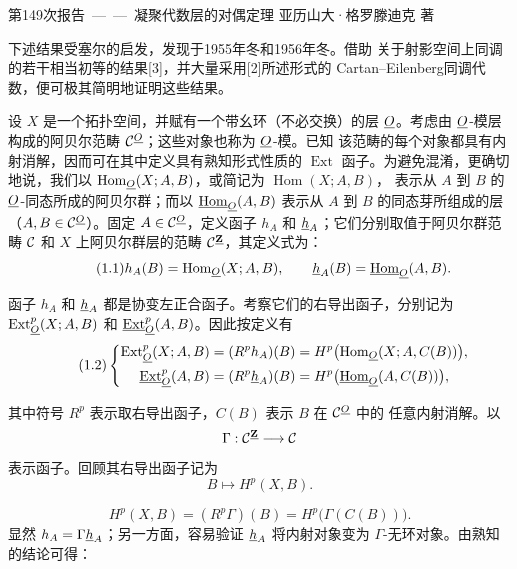 \unit{第149次报告——凝聚代数层的对偶定理}
%
  {亚历山大·格罗滕迪克 著}

下述结果受塞尔的启发，发现于1955年冬和1956年冬。借助
关于射影空间上同调的若干相当初等的结果[3]，并大量采用[2]所述形式的
Cartan--Eilenberg同调代数，便可极其简明地证明这些结果。


设 $X$ 是一个拓扑空间，并赋有一个带幺环（不必交换）的层 $\underline{O}$。考虑由
$\underline{O}$-模层构成的阿贝尔范畴 $\mathcal C^{\underline{O}}$；这些对象也称为 $\underline{O}$-模。已知
该范畴的每个对象都具有内射消解，因而可在其中定义具有熟知形式性质的
$\operatorname{Ext}$ 函子。为避免混淆，更确切地说，我们以
$\operatorname{Hom}_{\underline{O}}(X;A,B)$，或简记为 $\operatorname{Hom}(X;A,B)$，
表示从 $A$ 到 $B$ 的 $\underline{O}$-同态所成的阿贝尔群；而以
$\underline{\operatorname{Hom}}_{\underline{O}}(A,B)$ 表示从 $A$ 到 $B$ 的同态芽所组成的层
（$A,B\in\mathcal C^{\underline{O}}$）。固定 $A\in\mathcal C^{\underline{O}}$，定义函子 $h_A$ 和
$\underline{h}_A$；它们分别取值于阿贝尔群范畴 $\mathcal C$ 和 $X$ 上阿贝尔群层的范畴
$\mathcal C^{\underline{\mathbf Z}}$，其定义式为：
\begin{equation}\tag{1.1}
  h_A(B)=\operatorname{Hom}_{\underline{O}}(X;A,B),
  \qquad
  \underline{h}_A(B)=\underline{\operatorname{Hom}}_{\underline{O}}(A,B).
\end{equation}

函子 $h_A$ 和 $\underline{h}_A$ 都是协变左正合函子。考察它们的右导出函子，分别记为
$\operatorname{Ext}_{\underline{O}}^{p}(X;A,B)$ 和 $\underline{\operatorname{Ext}}_{\underline{O}}^{p}(A,B)$。因此按定义有
\begin{equation}\tag{1.2}
\left\{
\begin{aligned}
\operatorname{Ext}_{\underline{O}}^{p}(X;A,B)
  &= (R^{p}h_A)(B)
   = H^{p}\bigl(\operatorname{Hom}_{\underline{O}}(X;A,C(B))\bigr),\\
\underline{\operatorname{Ext}}_{\underline{O}}^{p}(A,B)
  &= (R^{p}\underline{h}_A)(B)
   = H^{p}\bigl(\underline{\operatorname{Hom}}_{\underline{O}}(A,C(B))\bigr),
\end{aligned}
\right.
\end{equation}

其中符号 $R^{p}$ 表示取右导出函子，$C(B)$ 表示 $B$ 在 $\mathcal C^{\underline{O}}$ 中的
任意内射消解。以
\[
  \Gamma:\mathcal C^{\underline{\mathbf Z}}\longrightarrow\mathcal C
\]
表示函子。回顾其右导出函子记为
\[
  B\longmapsto H^{p}(X,B).
\]

\begin{equation}\tag{1.3}
  H^{p}(X,B)=(R^{p}\Gamma)(B)=H^{p}\bigl(\Gamma(C(B))\bigr).
\end{equation}
显然 $h_A=\Gamma\underline{h}_A$；另一方面，容易验证 $\underline{h}_A$ 将内射对象变为
$\Gamma$-无环对象。由熟知的结论可得：

